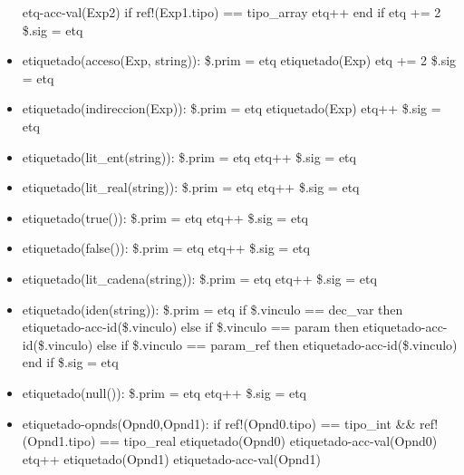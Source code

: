 \documentclass[11pt]{article}
\begin{document}
\begin{itemize}
            \subitem etq-acc-val(Exp2)
            \subitem if ref!(Exp1.tipo) == tipo\_array
                \subsubitem etq++
            \subitem end if
            \subitem etq += 2
            \subitem \$.sig = etq
        \item etiquetado(acceso(Exp, string)): 
            \subitem \$.prim = etq
            \subitem etiquetado(Exp)
            \subitem etq += 2
            \subitem \$.sig = etq
        \item etiquetado(indireccion(Exp)): 
            \subitem \$.prim = etq
            \subitem etiquetado(Exp)
            \subitem etq++
            \subitem \$.sig = etq
        \item etiquetado(lit\_ent(string)): 
            \subitem \$.prim = etq
            \subitem etq++
            \subitem \$.sig = etq
        \item etiquetado(lit\_real(string)): 
            \subitem \$.prim = etq
            \subitem etq++
            \subitem \$.sig = etq
        \item etiquetado(true()): 
            \subitem \$.prim = etq
            \subitem etq++
            \subitem \$.sig = etq
        \item etiquetado(false()): 
            \subitem \$.prim = etq
            \subitem etq++
            \subitem \$.sig = etq
        \item etiquetado(lit\_cadena(string)): 
            \subitem \$.prim = etq
            \subitem etq++
            \subitem \$.sig = etq
        \item etiquetado(iden(string)): 
            \subitem \$.prim = etq
            \subitem if \$.vinculo == dec\_var then
                \subsubitem etiquetado-acc-id(\$.vinculo)
            \subitem else if \$.vinculo == param then
                \subsubitem etiquetado-acc-id(\$.vinculo)
            \subitem else if \$.vinculo == param\_ref then
                \subsubitem etiquetado-acc-id(\$.vinculo)
            \subitem end if
            \subitem \$.sig = etq
        \item etiquetado(null()): 
            \subitem \$.prim = etq
            \subitem etq++
            \subitem \$.sig = etq
        \item etiquetado-opnds(Opnd0,Opnd1): 
            \subitem if ref!(Opnd0.tipo) == tipo\_int \&\& ref!(Opnd1.tipo) == tipo\_real
                \subsubitem etiquetado(Opnd0)
                \subsubitem etiquetado-acc-val(Opnd0)
                \subsubitem etq++
                \subsubitem etiquetado(Opnd1)
                \subsubitem etiquetado-acc-val(Opnd1)

\end{itemize}
\end{document}

